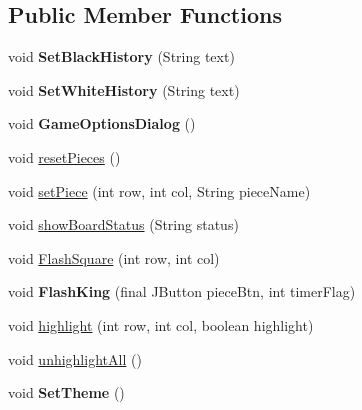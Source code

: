 \subsection*{Public Member Functions}
\begin{DoxyCompactItemize}
\item 
\hypertarget{classswantech_1_1_game_board_a96ebddb815846afa4c27770196677e93}{}void {\bfseries Set\+Black\+History} (String text)\label{classswantech_1_1_game_board_a96ebddb815846afa4c27770196677e93}

\item 
\hypertarget{classswantech_1_1_game_board_ad3af6eb08224d1765b3d7d350b35235e}{}void {\bfseries Set\+White\+History} (String text)\label{classswantech_1_1_game_board_ad3af6eb08224d1765b3d7d350b35235e}

\item 
\hypertarget{classswantech_1_1_game_board_a0c035906eeeb258acfaa8b5d55d0ca0f}{}void {\bfseries Game\+Options\+Dialog} ()\label{classswantech_1_1_game_board_a0c035906eeeb258acfaa8b5d55d0ca0f}

\item 
void \hyperlink{classswantech_1_1_game_board_a8b593a2b2e1f7ace526aaeceaef99724}{reset\+Pieces} ()
\item 
void \hyperlink{classswantech_1_1_game_board_add61d2ac401b20f5f847ca0e96c9caa5}{set\+Piece} (int row, int col, String piece\+Name)
\item 
void \hyperlink{classswantech_1_1_game_board_aa19d65d287fdbcc49088dfe04b1d02d8}{show\+Board\+Status} (String status)
\item 
void \hyperlink{classswantech_1_1_game_board_a37481f0e2444ee2e092edc3e714382bc}{Flash\+Square} (int row, int col)
\item 
\hypertarget{classswantech_1_1_game_board_acb2c628f03939ded12ccfee1c32a9c23}{}void {\bfseries Flash\+King} (final J\+Button piece\+Btn, int timer\+Flag)\label{classswantech_1_1_game_board_acb2c628f03939ded12ccfee1c32a9c23}

\item 
void \hyperlink{classswantech_1_1_game_board_a77b64cccf5aaa809b608c4a8de53ccd9}{highlight} (int row, int col, boolean highlight)
\item 
void \hyperlink{classswantech_1_1_game_board_aaa24ba8f39f0246860a47641f71a6ddf}{unhighlight\+All} ()
\item 
\hypertarget{classswantech_1_1_game_board_a0a4e857cfd4b2a7a1b9ac6fa9073a968}{}void {\bfseries Set\+Theme} ()\label{classswantech_1_1_game_board_a0a4e857cfd4b2a7a1b9ac6fa9073a968}

\end{DoxyCompactItemize}
